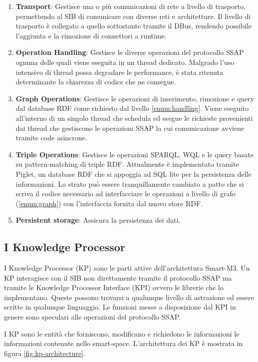 \begin{enumerate}
	\item \textbf{Transport}: Gestisce una o più comunicazioni di rete a livello di trasporto, permettendo al SIB di comunicare con diverse reti e architetture. Il livello di trasporto è collegato a quello sottostante tramite il DBus, rendendo possibile l'aggiunta e la rimozione di connettori a runtime.
	\item \label{enum:handling}\textbf{Operation Handling}: Gestisce le diverse operazioni del protocollo SSAP ognuna delle quali viene eseguita in un thread dedicato. Malgrado l'uso intensivo di thread possa degradare le performance,  è stata ritenuta determinante la chiarezza di codice che ne consegue.
	\item \label{enum:graph}\textbf{Graph Operations}: Gestisce le operazioni di inserimento, rimozione e query dal database RDF come richiesto dal livello \ref{enum:handling}. Viene eseguito all'interno di un singolo thread che schedula ed esegue le richieste provenienti dai thread che gestiscono le operazioni SSAP la cui comunicazione avviene tramite code asincrone.
	\item \textbf{Triple Operations}: Gestisce le operazioni SPARQL, WQL e le query basate su pattern-matching di triple RDF. Attualmente è implementato tramite Piglet, un database RDF che si appoggia ad SQL lite per la persistenza delle informazioni. Lo strato può essere tranquillamente cambiato a patto che si scriva il codice necessario ad interfacciare le operazioni a livello di grafo (\ref{enum:graph}) con l'interfaccia fornita dal nuovo store RDF.
	\item \textbf{Persistent storage}: Assicura la persistenza dei dati.
\end{enumerate}

\subsection{I Knowledge Processor}

I Knowledge Processor (KP) sono le parti attive dell'architettura Smart-M3. Un KP interagisce con il SIB non direttamente tramite il protocollo SSAP ma tramite le Knowledge Processor Interface (KPI) ovvero le librerie che lo implementano. Queste possono trovarsi a qualunque livello di astrazione ed essere scritte in qualunque linguaggio. Le funzioni messe a disposizione dal KPI in genere sono speculari alle operazioni del protocollo SSAP.

I KP sono le entità che forniscono, modificano e richiedono le informazioni le informazioni contenute nello smart-space. L'architettura dei KP è mostrata in figura \ref{fig:kp-architecture}.

